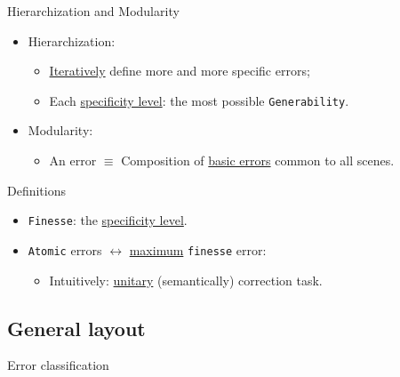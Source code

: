 \documentclass[10pt]{beamer}
\begin{document}
            \begin{frame}{Hierarchization and Modularity}
                \begin{itemize}[label=\(\blacktriangleright\), font=\color{IGNGreen}, itemsep=2em]
                    \item<1-> Hierarchization:
                        \begin{itemize}[label=\(\blacktriangleright\), font=\color{IGNGreen}, itemsep=2em]
                            \item<2-> \underline{Iteratively} define more and more specific errors;
                            \item<3-> Each \underline{specificity level}: the most possible \texttt{Generability}.
                        \end{itemize}
                    \item<4-> Modularity:
                        \begin{itemize}[label=\(\blacktriangleright\), font=\color{IGNGreen}, itemsep=2em]
                            \item<5-> An error \(\equiv\) Composition of \underline{basic errors} common to all scenes.
                        \end{itemize}
                \end{itemize}
            \end{frame}

            \begin{frame}{Definitions}
                \begin{itemize}[label=\(\blacktriangleright\), font=\color{IGNGreen}, itemsep=2em]
                    \item<1-> \texttt{Finesse}: the \underline{specificity level}.
                    \item<2-> \texttt{Atomic} errors \(\leftrightarrow\) \underline{maximum} \texttt{finesse} error:
                        \begin{itemize}
                            \item<3-> Intuitively: \underline{unitary} (semantically) correction task.
                        \end{itemize}
                \end{itemize}
            \end{frame}
        
        \subsection{General layout}
            \begin{frame}{Error classification}
                
            \end{frame}
\end{document}
